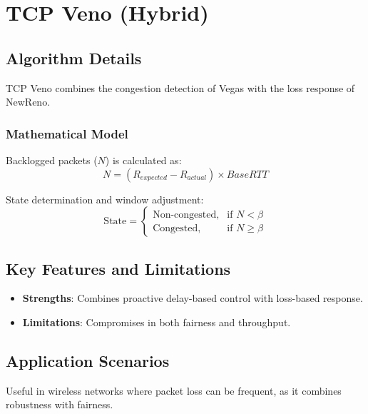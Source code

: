 \documentclass[11pt,a4paper]{article}
\begin{document}
\section{\textcolor{sectioncolor}{TCP Veno (Hybrid)}}
\begin{tcolorbox}[colback=boxbg, colframe=boxborder, title=TCP Veno Overview]
\subsection{{Algorithm Details}}
TCP Veno combines the congestion detection of Vegas with the loss response of NewReno.

\subsubsection*{Mathematical Model}
Backlogged packets ($N$) is calculated as:
\begin{equation}
N = (R_{expected} - R_{actual}) \times BaseRTT
\end{equation}

State determination and window adjustment:
\[
\text{State} = 
\begin{cases}
\text{Non-congested}, & \text{if } N < \beta \\
\text{Congested}, & \text{if } N \geq \beta
\end{cases}
\]

\subsection{\textcolor{textColor}{Key Features and Limitations}}
\begin{itemize}
    \item \textbf{Strengths}: Combines proactive delay-based control with loss-based response.
    \item \textbf{Limitations}: Compromises in both fairness and throughput.
\end{itemize}

\subsection{{Application Scenarios}}
Useful in wireless networks where packet loss can be frequent, as it combines robustness with fairness.
\end{tcolorbox}

\end{document}
